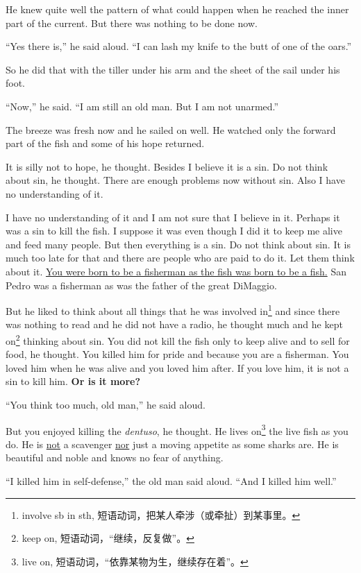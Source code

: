 He knew quite well the \gls{pattern} of what could happen when he reached
the inner part of the current. But there was nothing to be done now.

``Yes there is,'' he said aloud. ``I can lash my knife to the \gls{butt} of
one of the oars.''

So he did that with the tiller under his arm and the \gls{sheet} of the sail
under his foot.

``Now,'' he said. ``I am still an old man. But I am not unarmed.''

The breeze was fresh now and he sailed on well. He watched only the forward
part of the fish and some of his hope returned.

It is \gls{silly} not to hope, he thought. Besides I believe it is a
\gls{sin}. Do not think about sin, he thought. There are enough problems now
without sin. Also I have no \gls{understanding} of it.

I have no understanding of it and I am not sure that I believe in it.
Perhaps it was a sin to kill the fish. I suppose it was even though I did it
to keep me alive and feed many people. But then everything is a sin. Do not
think about sin. It is much too late for that and there are people who are
paid to do it. Let them think about it. \uline{You were born to be a
  fisherman as the fish was born to be a fish.} San Pedro was a fisherman as
was the father of the great DiMaggio.

But he liked to think about all things that he was \gls{involved}
in\footnote{involve sb in sth, 短语动词，把某人牵涉（或牵扯）到某事里。} and
since there was nothing to read and he did not have a radio, he thought much
and he kept on\footnote{keep on, 短语动词，“继续，反复做”。} thinking
about sin. You did not kill the fish only to keep alive and to sell for
food, he thought. You killed him for pride and because you are a fisherman.
You loved him when he was alive and you loved him after. If you love him, it
is not a sin to kill him. \textbf{Or is it more?}

``You think too much, old man,'' he said aloud.

But you enjoyed killing the \emph{dentuso}, he thought. He lives on\footnote{live
  on, 短语动词，“依靠某物为生，继续存在着”。} the live fish as you do. He
is \uline{not} a \gls{scavenger} \uline{nor} just a moving \gls{appetite} as some
sharks are. He is beautiful and noble and knows no fear of anything.

``I killed him in self-defense,'' the old man said aloud. ``And I killed him
well.''

